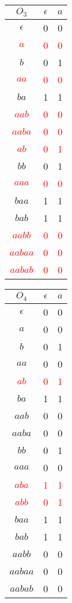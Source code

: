 \begin{minipage}{0.33\linewidth}
	\centering
	\begin{tabular}{|c|cc|}
		\hline
		$O_3$ & $\epsilon$ & $a$\\
		\hline
		$\epsilon$ & 0 &0\\
		\textcolor{red}{$a$}&\textcolor{red}{0}&\textcolor{red}{0}\\
		$b$&0&1\\
		\textcolor{red}{$aa$}&\textcolor{red}{0}&\textcolor{red}{0}\\
		$ba$&1&1\\
		\textcolor{red}{$aab$}&\textcolor{red}{0}&\textcolor{red}{0}\\
		\textcolor{red}{$aaba$}&\textcolor{red}{0}&\textcolor{red}{0}\\
		\hline
		\textcolor{red}{$ab$}&\textcolor{red}{0}&\textcolor{red}{1}\\
		$bb$&0&1\\
		\textcolor{red}{$aaa$}&\textcolor{red}{0}&\textcolor{red}{0}\\
		$baa$&1&1\\
		$bab$&1&1\\
		\textcolor{red}{$aabb$}&\textcolor{red}{0}&\textcolor{red}{0}\\
		\textcolor{red}{$aabaa$}&\textcolor{red}{0}&\textcolor{red}{0}\\
		\textcolor{red}{$aabab$}&\textcolor{red}{0}&\textcolor{red}{0}\\
		\hline
	\end{tabular}
\end{minipage}
\begin{minipage}{0.33\linewidth}
	\centering
	\begin{tabular}{|c|cc|}
		\hline
		$O_4$ & $\epsilon$ & $a$\\
		\hline
		$\epsilon$ & 0 &0\\
		$a$&0&0\\
		$b$&0&1\\
		$aa$&0&0\\
		\textcolor{red}{$ab$}&\textcolor{red}{0}&\textcolor{red}{1}\\
		$ba$&1&1\\
		$aab$&0&0\\
		$aaba$&0&0\\
		\hline
		$bb$&0&1\\
		$aaa$&0&0\\
		\textcolor{red}{$aba$}&\textcolor{red}{1}&\textcolor{red}{1}\\
		\textcolor{red}{$abb$}&\textcolor{red}{0}&\textcolor{red}{1}\\
		$baa$&1&1\\
		$bab$&1&1\\
		$aabb$&0&0\\
		$aabaa$&0&0\\
		$aabab$&0&0\\
		\hline
	\end{tabular}
\end{minipage}
